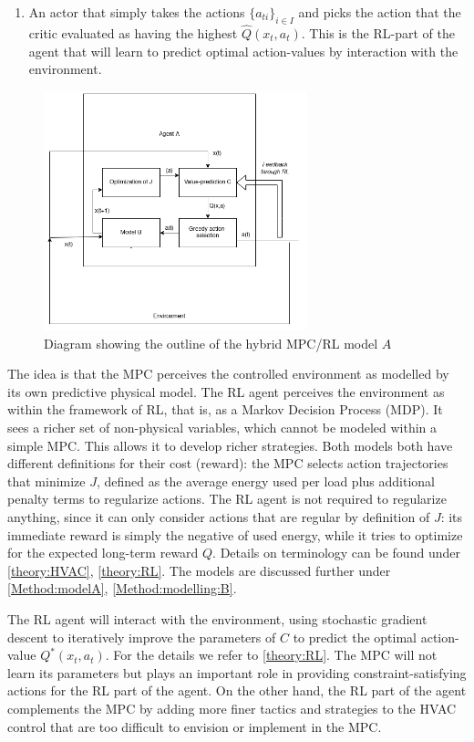 \documentclass{article}
\theoremstyle{definition}
\theoremstyle{remark}
\begin{document}
\begin{enumerate}
    \item An actor that simply takes the actions $\{a_{ti}\}_{i\in I}$ and picks the action that the critic evaluated as having the highest $\hat Q(x_t,a_t)$. This is the RL-part of the agent that will learn to predict optimal action-values by interaction with the environment.
\end{enumerate}

\begin{figure}
    \centering
    \includegraphics[width=3in]{thediagram.png}
    \caption{Diagram showing the outline of the hybrid MPC/RL model $A$}
    \label{fig:hybrid}
\end{figure}

The idea is that the MPC perceives the controlled environment as modelled by its own predictive physical model. The RL agent perceives the environment as within the framework of RL, that is, as a Markov Decision Process (MDP). It sees a richer set of non-physical  variables, which cannot be modeled within a simple MPC. This allows it to develop richer strategies. Both models both have different definitions for their cost (reward): the MPC selects action trajectories that minimize $J$, defined as the average energy used per load plus additional penalty terms to regularize actions. The RL agent is not required to regularize anything, since it can only consider actions that are regular by definition of $J$: its immediate reward is simply the negative of used energy, while it tries to optimize for the expected long-term reward $Q$. Details on terminology can be found under \ref{theory:HVAC}, \ref{theory:RL}. The models are discussed further under \ref{Method:modelA}, \ref{Method:modelling:B}.

The RL agent will interact with the environment, using stochastic gradient descent to iteratively improve the parameters of $C$ to predict the optimal action-value $Q^*(x_t,a_t)$. For the details we refer to \ref{theory:RL}. The MPC will not learn its parameters but plays an important role in providing constraint-satisfying actions for the RL part of the agent. On the other hand, the RL part of the agent complements the MPC by adding more finer tactics and strategies to the HVAC control that are too difficult to envision or implement in the MPC.
\end{document}
